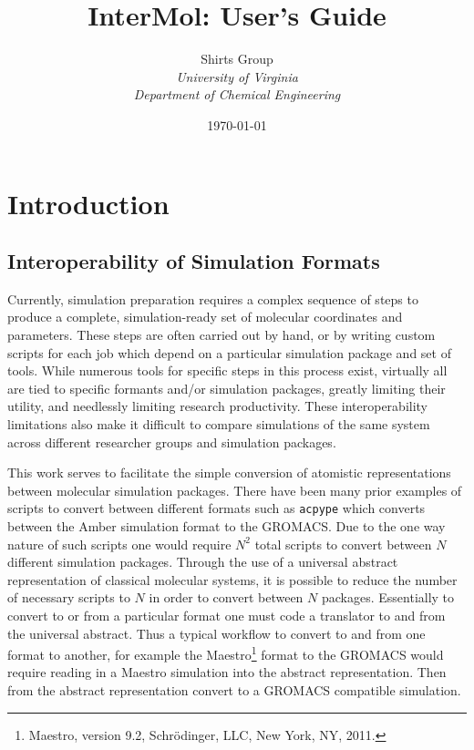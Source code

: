 \documentclass[12pt]{book}
\begin{document}
\title{InterMol: User's Guide}
\author{Shirts Group\\
\textit{University of Virginia}\\
\textit{Department of Chemical Engineering}}
\date{\today}
\renewcommand{\thepage}{\arabic{page}}
\maketitle
\tableofcontents
\chapter{Introduction}
\section{Interoperability of Simulation Formats}
\par Currently, simulation preparation requires a complex sequence of steps to produce a complete, simulation-ready set of molecular coordinates and parameters. These steps are often carried out by hand, or by writing custom scripts for each job which depend on a particular simulation package and set of tools. While numerous tools for specific steps in this process exist, virtually all are tied to specific formants and/or simulation packages, greatly limiting their utility, and needlessly limiting research productivity. These interoperability limitations also make it difficult to compare simulations of the same system across different researcher groups and simulation packages.

\par This work serves to facilitate the simple conversion of atomistic representations between molecular simulation packages. There have been many prior examples of scripts to convert between different formats such as {\tt acpype}\cite{SousadaSilva2012} which converts between the Amber simulation format to the GROMACS. Due to the one way nature of such scripts one would require $N^2$ total scripts to convert between $N$ different simulation packages. Through the use of a universal abstract representation of classical molecular systems, it is possible to reduce the number of necessary scripts to $N$ in order to convert between $N$ packages. Essentially to convert to or from a particular format one must code a translator to and from the universal abstract. Thus a typical workflow to convert to and from one format to another, for example the Maestro\footnote{Maestro, version 9.2, Schr\"{o}dinger, LLC, New York, NY, 2011.} format to the GROMACS would require reading in a Maestro simulation into the abstract representation. Then from the abstract representation convert to a GROMACS compatible simulation.
\end{document}
